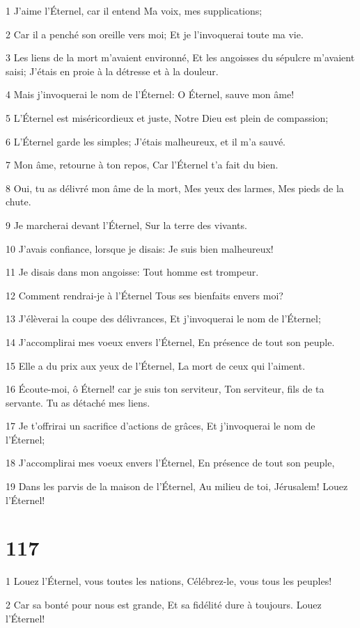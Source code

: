 \par 1 J'aime l'Éternel, car il entend Ma voix, mes supplications;
\par 2 Car il a penché son oreille vers moi; Et je l'invoquerai toute ma vie.
\par 3 Les liens de la mort m'avaient environné, Et les angoisses du sépulcre m'avaient saisi; J'étais en proie à la détresse et à la douleur.
\par 4 Mais j'invoquerai le nom de l'Éternel: O Éternel, sauve mon âme!
\par 5 L'Éternel est miséricordieux et juste, Notre Dieu est plein de compassion;
\par 6 L'Éternel garde les simples; J'étais malheureux, et il m'a sauvé.
\par 7 Mon âme, retourne à ton repos, Car l'Éternel t'a fait du bien.
\par 8 Oui, tu as délivré mon âme de la mort, Mes yeux des larmes, Mes pieds de la chute.
\par 9 Je marcherai devant l'Éternel, Sur la terre des vivants.
\par 10 J'avais confiance, lorsque je disais: Je suis bien malheureux!
\par 11 Je disais dans mon angoisse: Tout homme est trompeur.
\par 12 Comment rendrai-je à l'Éternel Tous ses bienfaits envers moi?
\par 13 J'élèverai la coupe des délivrances, Et j'invoquerai le nom de l'Éternel;
\par 14 J'accomplirai mes voeux envers l'Éternel, En présence de tout son peuple.
\par 15 Elle a du prix aux yeux de l'Éternel, La mort de ceux qui l'aiment.
\par 16 Écoute-moi, ô Éternel! car je suis ton serviteur, Ton serviteur, fils de ta servante. Tu as détaché mes liens.
\par 17 Je t'offrirai un sacrifice d'actions de grâces, Et j'invoquerai le nom de l'Éternel;
\par 18 J'accomplirai mes voeux envers l'Éternel, En présence de tout son peuple,
\par 19 Dans les parvis de la maison de l'Éternel, Au milieu de toi, Jérusalem! Louez l'Éternel!

\chapter{117}

\par 1 Louez l'Éternel, vous toutes les nations, Célébrez-le, vous tous les peuples!
\par 2 Car sa bonté pour nous est grande, Et sa fidélité dure à toujours. Louez l'Éternel!

